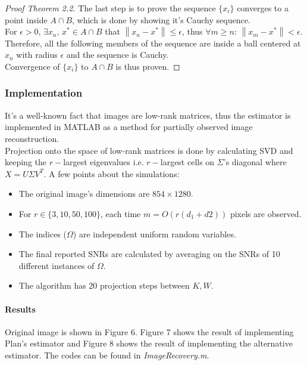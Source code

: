 \documentclass{amsart}
\theoremstyle{definition}
\theoremstyle{remark}
\numberwithin{equation}{section}
\newcommand\norm[1]{\left\lVert#1\right\rVert}
\begin{document}
\begin{proof}[Proof Theorem 2.2]
The last step is to prove the sequence $\{x_i\}$ converges to a point inside $A\cap B$, which is done by showing it's Cauchy sequence. \\
For $\epsilon>0,\, \exists x_n,\,x^*\in A\cap B$ that $\norm{x_n-x^*}\leq \epsilon$, thus $\forall m\geq n:\, \norm{x_m-x^*}<\epsilon$. Therefore, all the following members of the sequence are inside a ball centered at $x_n$ with radius $\epsilon$ and the sequence is Cauchy. \\

Convergence of $\{x_i\}$ to $A \cap B $ is thus proven.
\end{proof}
\subsubsection{\textbf{Implementation}} It's a well-known fact that images are low-rank matrices, thus the estimator is implemented in MATLAB as a method for partially observed image reconstruction.\\
Projection onto the space of low-rank matrices is done by calculating SVD and keeping the $r-$largest eigenvalues i.e.  $r-$largest cells on $\Sigma$'s diagonal where $X=U \Sigma V^T$. A few points about the simulations:\\
\begin{itemize}
\item The original image's dimensions are $854\times 1280$.
\item For $r \in \{3,10,50,100\}$, each time $m = O(r(d_1+d2))$ pixels are observed.
\item The indices ($\Omega$) are independent uniform random variables.
\item The final reported SNRs are calculated by averaging on the SNRs of 10 different instances of $\Omega$.
\item The algorithm has 20 projection steps between $K,W$.
\end{itemize}

\paragraph{Results} Original image is shown in Figure 6. Figure 7 shows the result of implementing Plan's estimator and Figure 8 shows the result of implementing the alternative estimator. The codes can be found in \textit{ImageRecovery.m}.
\end{document}
